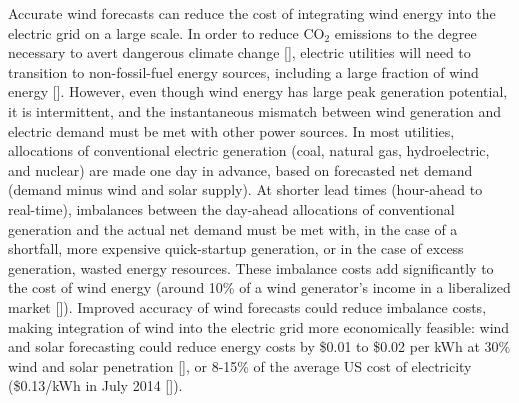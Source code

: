 Accurate wind forecasts can reduce the cost of integrating wind energy into the electric grid on a large scale.  In order to reduce CO$_2$ emissions to the degree necessary to avert dangerous climate change [\cite{stocker2013ipcc}], electric utilities will need to transition to non-fossil-fuel energy sources, including a large fraction of wind energy [\cite{jacobson2011providing}].  However, even though wind energy has large peak generation potential, it is intermittent, and the instantaneous mismatch between wind generation and electric demand must be met with other power sources.  In most utilities, allocations of conventional electric generation (coal, natural gas, hydroelectric, and nuclear) are made one day in advance, based on forecasted net demand (demand minus wind and solar supply).  At shorter lead times (hour-ahead to real-time), imbalances between the day-ahead allocations of conventional generation and the actual net demand must be met with, in the case of a shortfall, more expensive quick-startup generation, or in the case of excess generation, wasted energy resources.  These imbalance costs add significantly to the cost of wind energy (around 10\% of a wind generator's income in a liberalized market [\cite{fabbri2005assessment}]).  Improved accuracy of wind forecasts could reduce imbalance costs, making integration of wind into the electric grid more economically feasible: wind and solar forecasting could reduce energy costs by \$0.01 to \$0.02 per kWh at 30\% wind and solar penetration [\cite{energy2010western}], or 8-15\% of the average US cost of electricity (\$0.13/kWh in July 2014 [\cite{eia2014}]).


